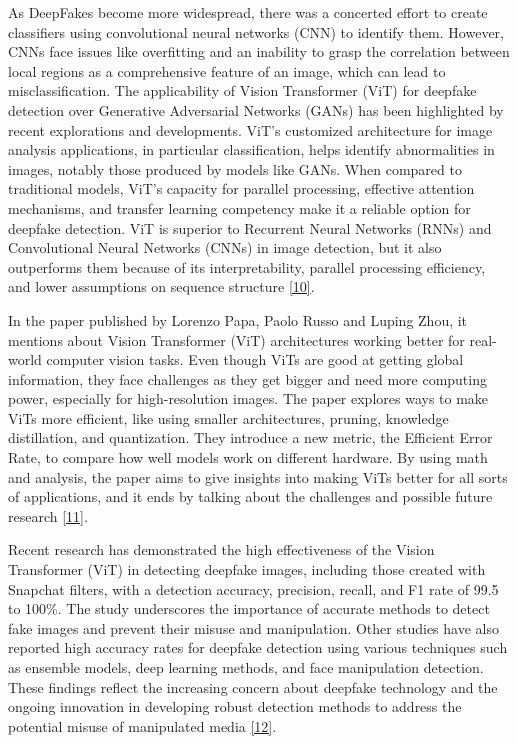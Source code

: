 \noindent As DeepFakes become more widespread, there was a concerted effort to create classifiers using convolutional neural networks (CNN) to identify them. However, CNNs face issues like overfitting and an inability to grasp the correlation between local regions as a comprehensive feature of an image, which can lead to misclassification. The applicability of Vision Transformer (ViT) for deepfake detection over Generative Adversarial Networks (GANs) has been highlighted by recent explorations and developments. ViT's customized architecture for image analysis applications, in particular classification, helps identify abnormalities in images, notably those produced by models like GANs. When compared to traditional models, ViT's capacity for parallel processing, effective attention mechanisms, and transfer learning competency make it a reliable option for deepfake detection. ViT is superior to Recurrent Neural Networks (RNNs) and Convolutional Neural Networks (CNNs) in image detection, but it also outperforms them because of its interpretability, parallel processing efficiency, and lower assumptions on sequence structure \hyperref[ref10]{[10]}.

\noindent In the paper published by Lorenzo Papa, Paolo Russo and Luping Zhou, it mentions about Vision Transformer (ViT) architectures working better for real-world computer vision tasks. Even though ViTs are good at getting global information, they face challenges as they get bigger and need more computing power, especially for high-resolution images. The paper explores ways to make ViTs more efficient, like using smaller architectures, pruning, knowledge distillation, and quantization. They introduce a new metric, the Efficient Error Rate, to compare how well models work on different hardware. By using math and analysis, the paper aims to give insights into making ViTs better for all sorts of applications, and it ends by talking about the challenges and possible future research \hyperref[ref11]{[11]}.

\noindent Recent research has demonstrated the high effectiveness of the Vision Transformer (ViT) in detecting deepfake images, including those created with Snapchat filters, with a detection accuracy, precision, recall, and F1 rate of 99.5 to 100\%. The study underscores the importance of accurate methods to detect fake images and prevent their misuse and manipulation. Other studies have also reported high accuracy rates for deepfake detection using various techniques such as ensemble models, deep learning methods, and face manipulation detection. These findings reflect the increasing concern about deepfake technology and the ongoing innovation in developing robust detection methods to address the potential misuse of manipulated media \hyperref[ref12]{[12]}.

